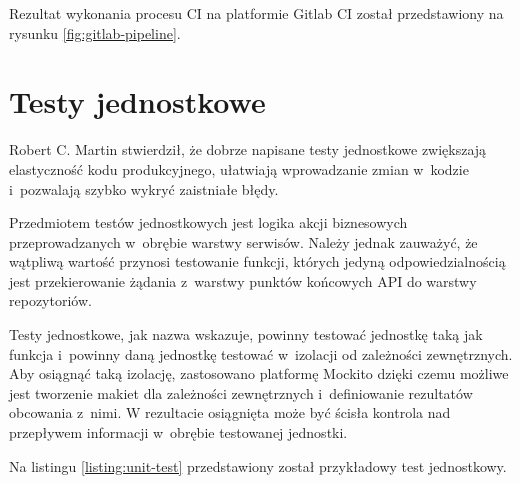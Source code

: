\par
Rezultat wykonania procesu CI na platformie Gitlab CI został przedstawiony na rysunku \ref{fig:gitlab-pipeline}.


\section{Testy jednostkowe}

Robert C. Martin stwierdził, że dobrze napisane testy jednostkowe zwiększają elastyczność kodu produkcyjnego,
ułatwiają wprowadzanie zmian w~kodzie i~pozwalają szybko wykryć zaistniałe błędy\cite{book:czysty-kod}.

\par
Przedmiotem testów jednostkowych jest logika akcji biznesowych przeprowadzanych w~obrębie warstwy serwisów.
Należy jednak zauważyć, że wątpliwą wartość przynosi testowanie funkcji,
których jedyną odpowiedzialnością jest przekierowanie żądania z~warstwy punktów końcowych API do warstwy repozytoriów.

\par
Testy jednostkowe, jak nazwa wskazuje, powinny testować jednostkę taką jak funkcja i~powinny daną jednostkę testować w~izolacji od zależności zewnętrznych\cite{book:testy-jednostkowe}.
Aby osiągnąć taką izolację, zastosowano platformę Mockito dzięki czemu możliwe jest tworzenie makiet dla zależności zewnętrznych i~definiowanie rezultatów obcowania z~nimi.
W rezultacie osiągnięta może być ścisła kontrola nad przepływem informacji w~obrębie testowanej jednostki.

\par
Na listingu \ref{listing:unit-test} przedstawiony został przykładowy test jednostkowy.

